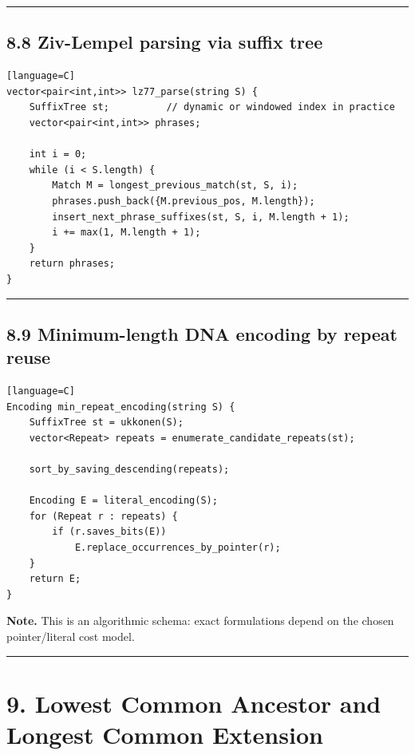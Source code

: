 \documentclass[11pt]{article}
\begin{document}
\begin{center}\rule{0.5\linewidth}{0.5pt}\end{center}

\subsection{8.8 Ziv-Lempel parsing via suffix tree}\label{ziv-lempel-parsing-via-suffix-tree}

\begin{verbatim}[language=C]
vector<pair<int,int>> lz77_parse(string S) {
    SuffixTree st;          // dynamic or windowed index in practice
    vector<pair<int,int>> phrases;

    int i = 0;
    while (i < S.length) {
        Match M = longest_previous_match(st, S, i);
        phrases.push_back({M.previous_pos, M.length});
        insert_next_phrase_suffixes(st, S, i, M.length + 1);
        i += max(1, M.length + 1);
    }
    return phrases;
}
\end{verbatim}

\begin{center}\rule{0.5\linewidth}{0.5pt}\end{center}

\subsection{8.9 Minimum-length DNA encoding by repeat reuse}\label{minimum-length-dna-encoding-by-repeat-reuse}

\begin{verbatim}[language=C]
Encoding min_repeat_encoding(string S) {
    SuffixTree st = ukkonen(S);
    vector<Repeat> repeats = enumerate_candidate_repeats(st);

    sort_by_saving_descending(repeats);

    Encoding E = literal_encoding(S);
    for (Repeat r : repeats) {
        if (r.saves_bits(E))
            E.replace_occurrences_by_pointer(r);
    }
    return E;
}
\end{verbatim}

\textbf{Note.} This is an algorithmic schema: exact formulations depend on the chosen pointer/literal cost model.

\begin{center}\rule{0.5\linewidth}{0.5pt}\end{center}

\section{9. Lowest Common Ancestor and Longest Common Extension}\label{lowest-common-ancestor-and-longest-common-extension}
\end{document}
